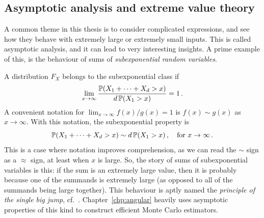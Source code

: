 

\subsection{Asymptotic analysis and extreme value theory} \label{sec:asymptotics}

A common theme in this thesis is to consider complicated expressions, and see how they behave with extremely large or extremely small inputs. This is called asymptotic analysis, and it can lead to very interesting insights. A prime example of this, is the behaviour of sums of \emph{subexponential random variables}.

A distribution $F_X$ belongs to the subexponential class if
\[ \lim_{x \to \infty} \frac{ \operatorname{{\mathbb P}}(X_1 + \dots + X_d > x) }{ d \operatorname{{\mathbb P}}(X_1 > x) } = 1 \,. \]
A convenient notation for $\lim_{x \to \infty} f(x)/g(x) = 1$ is $f(x) \sim g(x)$ as $x \to \infty$. With this notation, the subexponential property is
\[ \operatorname{{\mathbb P}}(X_1 + \dots + X_d > x) \sim d \operatorname{{\mathbb P}}(X_1 > x) \,, \quad \text{for } x \to \infty\,. \]
This is a case where notation improves comprehension, as we can read the $\sim$ sign as a $\approx$ sign, at least when $x$ is large. So, the story of sums of subexponential variables is this: if the sum is an extremely large value, then it is probably because one of the summands is extremely large (as opposed to all of the summands being large together). This behaviour is aptly named the \emph{principle of the single big jump}, cf.\ \cite{foss2011introduction}. Chapter~\ref{chp:angular} heavily uses asymptotic properties of this kind to construct efficient Monte Carlo estimators.

